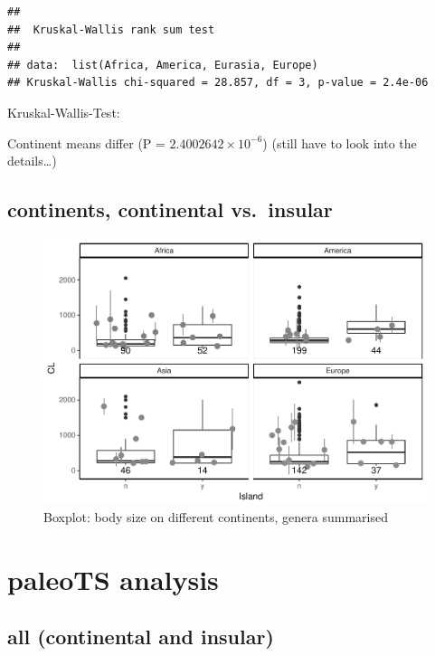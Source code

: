 \documentclass[]{article}
\begin{document}
\begin{verbatim}
## 
##  Kruskal-Wallis rank sum test
## 
## data:  list(Africa, America, Eurasia, Europe)
## Kruskal-Wallis chi-squared = 28.857, df = 3, p-value = 2.4e-06
\end{verbatim}

Kruskal-Wallis-Test:

Continent means differ (P = \(2.4002642\times 10^{-6}\)) (still have to
look into the details\ldots{})

\newpage

\subsection{continents, continental
vs.~insular}\label{continents-continental-vs.insular}

\begin{figure}[htbp]
\centering
\includegraphics{MA_JJ_files/figure-latex/Boxplot body size split into continents, continental vs. insular-1.pdf}
\caption{Boxplot: body size on different continents, genera summarised}
\end{figure}

\newpage

\section{paleoTS analysis}\label{paleots-analysis}

\subsection{all (continental and
insular)}\label{all-continental-and-insular}
\end{document}
